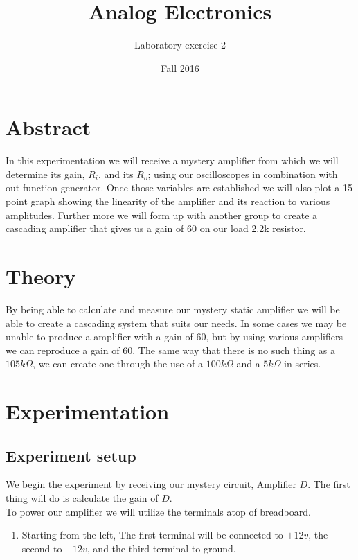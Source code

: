 \documentclass[12pt]{article}
\begin{document}
\title{Analog Electronics}
\author{Laboratory exercise 2}
\date{Fall 2016}
\maketitle

\newpage
\section{Abstract}

In this experimentation we will receive a mystery amplifier from which we will determine its gain, $R_i$, and its $R_o$; using our oscilloscopes in combination with out function generator. Once those variables are established we will also plot a 15 point graph showing the linearity of the amplifier and its reaction to various amplitudes. Further more we will form up with another group to create a cascading amplifier that gives us a gain of 60 on our load 2.2k resistor.

\section{Theory}

By being able to calculate and measure our mystery static amplifier we will be able to create a cascading system that suits our needs. In some cases we may be unable to produce a amplifier with a gain of 60, but by using various amplifiers we can reproduce a gain of 60. The same way that there is no such thing as a $105k \Omega$, we can create one through the use of a $100k \Omega$ and a $5k \Omega$ in series.


\newpage

\section{Experimentation}
\subsection{Experiment setup}




We begin the experiment by receiving our mystery circuit, Amplifier $D$. The first thing will do is calculate the gain of $D$. \\

To power our amplifier we will utilize the terminals atop of breadboard.
\begin{enumerate}
	\item Starting from the left, The first terminal will be connected to $+12v$, the second to $-12v$, and the third terminal to ground.
\end{enumerate}
\end{document}

